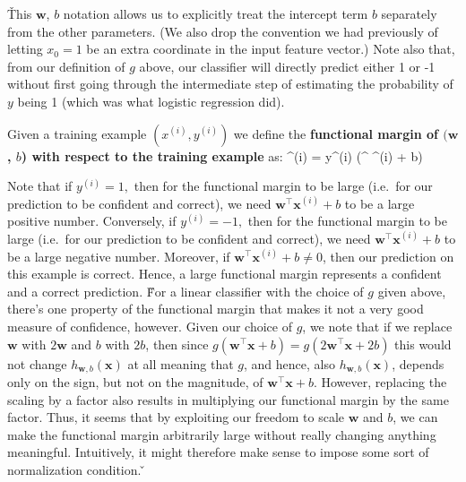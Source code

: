 \v

This $\boldsymbol{w}$, $b$ notation allows us to explicitly treat the intercept term $b$ separately from the other
parameters. (We also drop the convention we had previously of letting $x_0 = 1$ be an extra coordinate in the input
feature vector.) Note also that, from our definition of $g$ above, our classifier will directly predict either 1 or
-1 without first going through the intermediate step of estimating the probability of $y$ being 1 (which was what
logistic regression did).

Given a training example $(x^{(i)}, y^{(i)})$ we define the \textbf{functional margin of $(\boldsymbol{w}$, $b$) with
respect to the training example} as:
\bse
{\hat{\gamma}}^{(i)} = y^{(i)} (^{\intercal} ^{(i)} + b)
\ese
\ed

Note that if $y^{(i)}= 1,$ then for the functional margin to be large (i.e.\ for our prediction to be confident and
correct), we need $\boldsymbol{w}^{\intercal} \boldsymbol{x}^{(i)} + b$ to be a large positive number. Conversely, if
$y^{(i)}= -1,$ then for the functional margin to be large (i.e.\, for our prediction to be confident and correct),
we need $\boldsymbol{w}^{\intercal} \boldsymbol{x}^{(i)} + b$ to be a large negative number. Moreover, if
$\boldsymbol{w}^{\intercal} \boldsymbol{x}^{(i)} + b \neq 0$, then our prediction on this example is correct. Hence,
a large functional margin represents a confident and a correct prediction. \v

For a linear classifier with the choice of $g$ given above, there's one property of the functional margin that makes
it not a very good measure of confidence, however. Given our choice of $g$, we note that if we replace
$\boldsymbol{w}$ with $2\boldsymbol{w}$ and $b$ with $2b$, then since $g \left(\boldsymbol{w}^{\intercal} \boldsymbol{x} +
b\right) = g\left(2\boldsymbol{w}^{\intercal} \boldsymbol{x} + 2b\right)$ this would not change $h_{\boldsymbol{w}, b}
(\boldsymbol{x})$ at all meaning that $g$, and hence, also $h_{\boldsymbol{w}, b} (\boldsymbol{x})$, depends only on
the sign, but not on the magnitude, of $\boldsymbol{w}^{\intercal} \boldsymbol{x} + b$. However, replacing the
scaling by a factor also results in multiplying our functional margin by the same factor. Thus, it seems that by
exploiting our freedom to scale $\boldsymbol{w}$ and $b$, we can make the functional margin arbitrarily large without
really changing anything meaningful. Intuitively, it might therefore make sense to impose some sort of normalization
condition. \v

